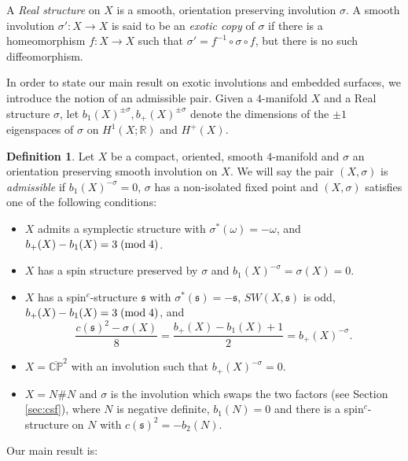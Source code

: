 \documentclass{amsart}
\theoremstyle{definition}
\newtheorem{definition}[theorem]{Definition}
\theoremstyle{remark}
\numberwithin{equation}{section}
\begin{document}
A {\em Real structure} on $X$ is a smooth, orientation preserving involution $\sigma$. A smooth involution $\sigma' : X \to X$ is said to be an {\em exotic copy} of $\sigma$ if there is a homeomorphism $f : X \to X$ such that $\sigma' = f^{-1} \circ \sigma \circ f$, but there is no such diffeomorphism.

In order to state our main result on exotic involutions and embedded surfaces, we introduce the notion of an admissible pair. Given a $4$-manifold $X$ and a Real structure $\sigma$, let $b_1(X)^{\pm \sigma}, b_+(X)^{\pm \sigma}$ denote the dimensions of the $\pm 1$ eigenspaces of $\sigma$ on $H^1(X ; \mathbb{R})$ and $H^+(X)$. 

\begin{definition}
Let $X$ be a compact, oriented, smooth $4$-manifold and $\sigma$ an orientation preserving smooth involution on $X$. We will say the pair $(X , \sigma)$ is {\em admissible} if $b_1(X)^{-\sigma} = 0$, $\sigma$ has a non-isolated fixed point and $(X,\sigma)$ satisfies one of the following conditions:
\begin{itemize}
\item[(1)]{$X$ admits a symplectic structure with $\sigma^*(\omega) = -\omega$, and $b_+(X) - b_1(X) = 3 \; ({\rm mod} \; 4)$.}
\item[(2)]{$X$ has a spin structure preserved by $\sigma$ and $b_1(X)^{-\sigma} = \sigma(X) = 0$.}
\item[(3)]{$X$ has a spin$^c$-structure $\mathfrak{s}$ with $\sigma^*(\mathfrak{s}) = -\mathfrak{s}$, $SW(X,\mathfrak{s})$ is odd, $b_+(X) - b_1(X) = 3 \; ({\rm mod} \; 4)$, and
\[
\frac{ c(\mathfrak{s})^2 - \sigma(X) }{8} = \frac{ b_+(X) - b_1(X) + 1}{2} = b_+(X)^{-\sigma}.
\]
}
\item[(4)]{$X = \overline{\mathbb{CP}}^2$ with an involution such that $b_+(X)^{-\sigma} = 0$.}
\item[(5)]{$X = N \# N$ and $\sigma$ is the involution which swaps the two factors (see Section \ref{sec:csf}), where $N$ is negative definite, $b_1(N) = 0$ and there is a spin$^c$-structure on $N$ with $c(\mathfrak{s})^2 = -b_2(N)$.}
\end{itemize}

\end{definition}

Our main result is:
\end{document}
